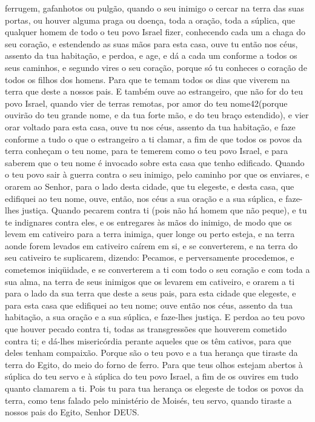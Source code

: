ferrugem, gafanhotos ou pulgão, quando o seu inimigo o cercar na
terra das suas portas, ou houver alguma praga ou doença, toda
a oração, toda a súplica, que qualquer homem de todo o teu povo
Israel fizer, conhecendo cada um a chaga do seu coração, e
estendendo as suas mãos para esta casa, ouve tu então nos
céus, assento da tua habitação, e perdoa, e age, e dá a cada um
conforme a todos os seus caminhos, e segundo vires o seu coração,
porque só tu conheces o coração de todos os filhos dos homens.
Para que te temam todos os dias que viverem na terra que
deste a nossos pais. E também ouve ao estrangeiro, que não
for do teu povo Israel, quando vier de terras remotas, por amor do
teu nome42(porque ouvirão do teu grande nome, e da tua forte mão, e
do teu braço estendido), e vier orar voltado para esta casa,
ouve tu nos céus, assento da tua habitação, e faze conforme a
tudo o que o estrangeiro a ti clamar, a fim de que todos os povos da
terra conheçam o teu nome, para te temerem como o teu povo Israel, e
para saberem que o teu nome é invocado sobre esta casa que tenho
edificado. Quando o teu povo sair à guerra contra o seu
inimigo, pelo caminho por que os enviares, e orarem ao Senhor, para
o lado desta cidade, que tu elegeste, e desta casa, que edifiquei ao
teu nome, ouve, então, nos céus a sua oração e a sua súplica,
e faze-lhes justiça. Quando pecarem contra ti (pois não há
homem que não peque), e tu te indignares contra eles, e os
entregares às mãos do inimigo, de modo que os levem em cativeiro
para a terra inimiga, quer longe ou perto esteja, e na terra
aonde forem levados em cativeiro caírem em si, e se converterem, e
na terra do seu cativeiro te suplicarem, dizendo: Pecamos, e
perversamente procedemos, e cometemos iniqüidade, e se
converterem a ti com todo o seu coração e com toda a sua alma, na
terra de seus inimigos que os levarem em cativeiro, e orarem a ti
para o lado da sua terra que deste a seus pais, para esta cidade que
elegeste, e para esta casa que edifiquei ao teu nome; ouve
então nos céus, assento da tua habitação, a sua oração e a sua
súplica, e faze-lhes justiça. E perdoa ao teu povo que houver
pecado contra ti, todas as transgressões que houverem cometido
contra ti; e dá-lhes misericórdia perante aqueles que os têm
cativos, para que deles tenham compaixão. Porque são o teu
povo e a tua herança que tiraste da terra do Egito, do meio do forno
de ferro. Para que teus olhos estejam abertos à súplica do
teu servo e à súplica do teu povo Israel, a fim de os ouvires em
tudo quanto clamarem a ti. Pois tu para tua herança os
elegeste de todos os povos da terra, como tens falado pelo
ministério de Moisés, teu servo, quando tiraste a nossos pais do
Egito, Senhor DEUS.

